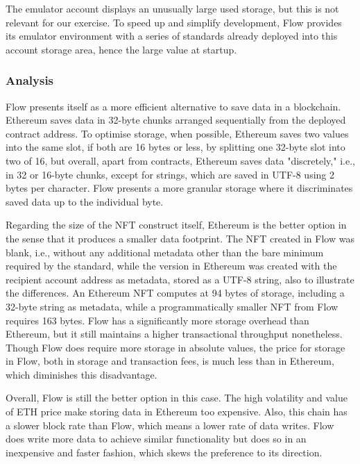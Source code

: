 \documentclass[../NFTComp_IEEE.tex]{subfiles}
\begin{document}
The emulator account displays an unusually large used storage, but this is not relevant for our exercise. To speed up and simplify development, Flow provides its emulator environment with a series of standards already deployed into this account storage area, hence the large value at startup.

\subsubsection{Analysis}
Flow presents itself as a more efficient alternative to save data in a blockchain. Ethereum saves data in 32-byte chunks arranged sequentially from the deployed contract address. To optimise storage, when possible, Ethereum saves two values into the same slot, if both are 16 bytes or less, by splitting one 32-byte slot into two of 16, but overall, apart from contracts, Ethereum saves data "discretely," i.e., in 32 or 16-byte chunks, except for strings, which are saved in UTF-8 using 2 bytes per character. Flow presents a more granular storage where it discriminates saved data up to the individual byte.
\par
Regarding the size of the NFT construct itself, Ethereum is the better option in the sense that it produces a smaller data footprint. The NFT created in Flow was blank, i.e., without any additional metadata other than the bare minimum required by the standard, while the version in Ethereum was created with the recipient account address as metadata, stored as a UTF-8 string, also to illustrate the differences. An Ethereum NFT computes at 94 bytes of storage, including a 32-byte string as metadata, while a programmatically smaller NFT from Flow requires 163 bytes. Flow has a significantly more storage overhead than Ethereum, but it still maintains a higher transactional throughput nonetheless. Though Flow does require more storage in absolute values, the price for storage in Flow, both in storage and transaction fees, is much less than in Ethereum, which diminishes this disadvantage.
\par
Overall, Flow is still the better option in this case. The high volatility and value of ETH price make storing data in Ethereum too expensive. Also, this chain has a slower block rate than Flow, which means a lower rate of data writes. Flow does write more data to achieve similar functionality but does so in an inexpensive and faster fashion, which skews the preference to its direction.
\end{document}
